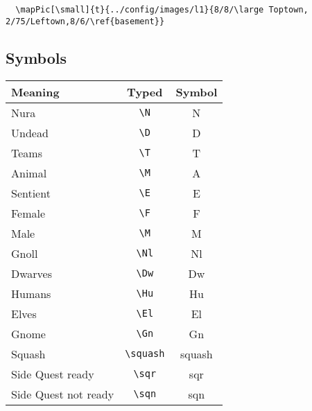 \documentclass[a4paper,openany]{book}
\begin{document}
\begin{multicols}{2}
\begin{verbatim}
  \mapPic[\small]{t}{../config/images/l1}{8/8/\large Toptown, 2/75/Leftown,8/6/\ref{basement}}
\end{verbatim}

\subsection{Symbols}

\begin{tabularx}{\linewidth}{Xcc}

  Meaning & Typed & Symbol \\\hline

  Nura & {\tt \textbackslash{N}} & \gls{N} \\

  Undead & {\tt \textbackslash{D}} & \gls{D} \\
  \hline
  Teams & {\tt \textbackslash{T}} & \gls{T} \\

  Animal & {\tt \textbackslash{M}} & \gls{A} \\

  Sentient & {\tt \textbackslash{E}} & \gls{E} \\

  Female & {\tt \textbackslash{F}} & \gls{F} \\

  Male & {\tt \textbackslash{M}} & \gls{M} \\

  \hline
  Gnoll & {\tt \textbackslash{Nl}} & \gls{Nl} \\

  Dwarves & {\tt \textbackslash{Dw}} & \gls{Dw} \\

  Humans & {\tt \textbackslash{Hu}} & \gls{Hu} \\

  Elves & {\tt \textbackslash{El}} & \gls{El} \\

  Gnome & {\tt \textbackslash{Gn}} & \gls{Gn} \\
  \hline
  Squash & {\tt \textbackslash{squash}} & \gls{squash} \\

  Side Quest ready & {\tt \textbackslash{sqr}} & \gls{sqr} \\

  Side Quest not ready & {\tt \textbackslash{sqn}} & \gls{sqn} \\

\end{tabularx}

\end{multicols}
\end{document}
